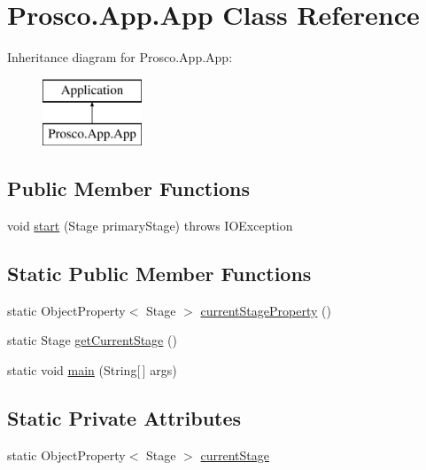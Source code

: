 \hypertarget{class_prosco_1_1_app_1_1_app}{\section{Prosco.\-App.\-App Class Reference}
\label{class_prosco_1_1_app_1_1_app}
}
Inheritance diagram for Prosco.\-App.\-App\-:\begin{figure}[H]
\begin{center}
\leavevmode
\includegraphics[height=2.000000cm]{class_prosco_1_1_app_1_1_app}
\end{center}
\end{figure}
\subsection*{Public Member Functions}
\begin{DoxyCompactItemize}
\item 
void \hyperlink{class_prosco_1_1_app_1_1_app_ac7a278030dcc09c4555a02a486053337}{start} (Stage primary\-Stage)  throws I\-O\-Exception 
\end{DoxyCompactItemize}
\subsection*{Static Public Member Functions}
\begin{DoxyCompactItemize}
\item 
static Object\-Property$<$ Stage $>$ \hyperlink{class_prosco_1_1_app_1_1_app_ad017ef8c92c342dcf88a78e3d1a9be96}{current\-Stage\-Property} ()
\item 
static Stage \hyperlink{class_prosco_1_1_app_1_1_app_a5acb7d1f45c619f4ff59c966d02fa23c}{get\-Current\-Stage} ()
\item 
static void \hyperlink{class_prosco_1_1_app_1_1_app_aa3c0f99606025770f5de6cc5a1e4f5c9}{main} (String\mbox{[}$\,$\mbox{]} args)
\end{DoxyCompactItemize}
\subsection*{Static Private Attributes}
\begin{DoxyCompactItemize}
\item 
static Object\-Property$<$ Stage $>$ \hyperlink{class_prosco_1_1_app_1_1_app_a625c10eb01309fae38fdcc9cfcb1bb73}{current\-Stage}
\end{DoxyCompactItemize}


